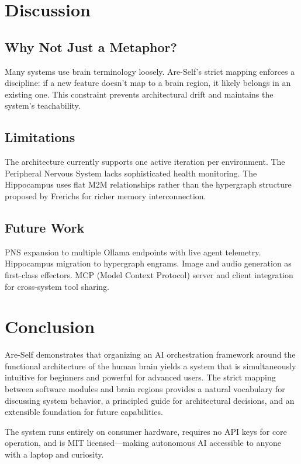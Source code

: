 \documentclass[man,12pt,floatsintext]{apa7}
\begin{document}

\section{Discussion}

\subsection{Why Not Just a Metaphor?}

Many systems use brain terminology loosely. Are-Self's strict mapping enforces a
discipline: if a new feature doesn't map to a brain region, it likely belongs in an
existing one. This constraint prevents architectural drift and maintains the system's
teachability.

\subsection{Limitations}

The architecture currently supports one active iteration per environment. The Peripheral
Nervous System lacks sophisticated health monitoring. The Hippocampus uses flat M2M
relationships rather than the hypergraph structure proposed by Frerichs for richer
memory interconnection.

\subsection{Future Work}

PNS expansion to multiple Ollama endpoints with live agent telemetry. Hippocampus
migration to hypergraph engrams. Image and audio generation as first-class effectors.
MCP (Model Context Protocol) server and client integration for cross-system tool sharing.

\section{Conclusion}

Are-Self demonstrates that organizing an AI orchestration framework around the functional
architecture of the human brain yields a system that is simultaneously intuitive for
beginners and powerful for advanced users. The strict mapping between software modules and
brain regions provides a natural vocabulary for discussing system behavior, a principled
guide for architectural decisions, and an extensible foundation for future capabilities.

The system runs entirely on consumer hardware, requires no API keys for core operation,
and is MIT licensed---making autonomous AI accessible to anyone with a laptop and
curiosity.

\printbibliography
\end{document}
